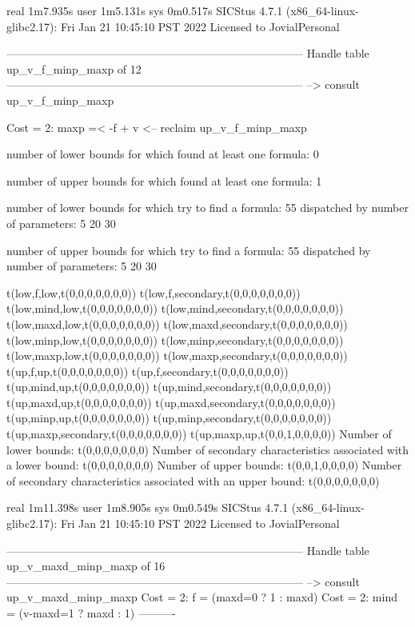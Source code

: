 real	1m7.935s
user	1m5.131s
sys	0m0.517s
SICStus 4.7.1 (x86_64-linux-glibc2.17): Fri Jan 21 10:45:10 PST 2022
Licensed to JovialPersonal


--------------------------------------------------------------------------------
Handle table up_v_f_minp_maxp of 12
--------------------------------------------------------------------------------
--> consult up_v_f_minp_maxp

Cost =  2:  maxp =< -f + v
<-- reclaim up_v_f_minp_maxp

number of lower bounds for which found at least one formula: 0

number of upper bounds for which found at least one formula: 1

number of lower bounds for which try to find a formula: 55
dispatched by number of parameters: 5  20  30

number of upper bounds for which try to find a formula: 55
dispatched by number of parameters: 5  20  30

t(low,f,low,t(0,0,0,0,0,0,0))
t(low,f,secondary,t(0,0,0,0,0,0,0))
t(low,mind,low,t(0,0,0,0,0,0,0))
t(low,mind,secondary,t(0,0,0,0,0,0,0))
t(low,maxd,low,t(0,0,0,0,0,0,0))
t(low,maxd,secondary,t(0,0,0,0,0,0,0))
t(low,minp,low,t(0,0,0,0,0,0,0))
t(low,minp,secondary,t(0,0,0,0,0,0,0))
t(low,maxp,low,t(0,0,0,0,0,0,0))
t(low,maxp,secondary,t(0,0,0,0,0,0,0))
t(up,f,up,t(0,0,0,0,0,0,0))
t(up,f,secondary,t(0,0,0,0,0,0,0))
t(up,mind,up,t(0,0,0,0,0,0,0))
t(up,mind,secondary,t(0,0,0,0,0,0,0))
t(up,maxd,up,t(0,0,0,0,0,0,0))
t(up,maxd,secondary,t(0,0,0,0,0,0,0))
t(up,minp,up,t(0,0,0,0,0,0,0))
t(up,minp,secondary,t(0,0,0,0,0,0,0))
t(up,maxp,secondary,t(0,0,0,0,0,0,0))
t(up,maxp,up,t(0,0,1,0,0,0,0))
Number of lower bounds:                                             t(0,0,0,0,0,0,0)
Number of secondary characteristics associated with a lower bound:  t(0,0,0,0,0,0,0)
Number of upper bounds:                                             t(0,0,1,0,0,0,0)
Number of secondary characteristics associated with an upper bound: t(0,0,0,0,0,0,0)

real	1m11.398s
user	1m8.905s
sys	0m0.549s
SICStus 4.7.1 (x86_64-linux-glibc2.17): Fri Jan 21 10:45:10 PST 2022
Licensed to JovialPersonal


--------------------------------------------------------------------------------
Handle table up_v_maxd_minp_maxp of 16
--------------------------------------------------------------------------------
--> consult up_v_maxd_minp_maxp
Cost =  2:  f    = (maxd=0 ? 1 : maxd)
Cost =  2:  mind = (v-maxd=1 ? maxd : 1)
----------

